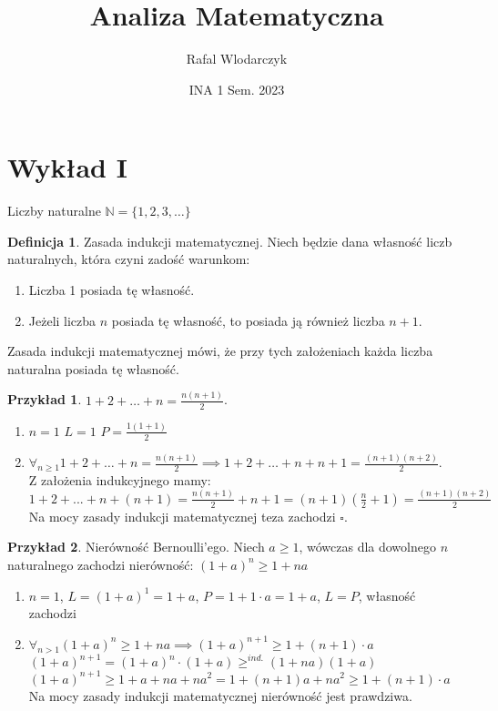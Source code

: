 \documentclass{article}
\author{Rafal Wlodarczyk}
\title{Analiza Matematyczna}
\date{INA 1 Sem. 2023}
\theoremstyle{definition}
\newtheorem{de}{Definicja}[subsection]
\theoremstyle{definition}
\theoremstyle{definition}
\newtheorem{pk}{Przykład}[subsection]
\theoremstyle{definition}
\begin{document}
\maketitle

\tableofcontents

\section{Wykład I}

Liczby naturalne $\mathbb{N}=\{1,2,3,\dots\}$

\begin{de}
    Zasada indukcji matematycznej. Niech będzie dana własność liczb naturalnych, która czyni zadość warunkom:
    \begin{enumerate}
        \item Liczba 1 posiada tę własność.
        \item Jeżeli liczba $n$ posiada tę własność, to posiada ją również liczba $n+1$.
    \end{enumerate}
    Zasada indukcji matematycznej mówi, że przy tych założeniach każda liczba naturalna posiada tę własność.
\end{de}

\begin{pk}
    $1+2+\dots+n=\frac{n(n+1)}{2}$.
    \begin{enumerate}
        \item $n=1$ $L=1$ $P=\frac{1(1+1)}{2}$
        \item $\forall_{n\geq 1} 1+2+\dots+n=\frac{n(n+1)}{2} \implies 1+2+\dots+n+n+1=\frac{(n+1)(n+2)}{2}$.\\
        Z założenia indukcyjnego mamy:\\
        $1+2+...+n+(n+1)=\frac{n(n+1)}{2}+n+1=(n+1)(\frac{n}{2}+1)=\frac{(n+1)(n+2)}{2}$\\
        Na mocy zasady indukcji matematycznej teza zachodzi $\square$.
    \end{enumerate}
\end{pk}

\begin{pk}
    Nierówność Bernoulli'ego. Niech $a\geq 1$, wówczas dla dowolnego $n$ naturalnego zachodzi nierówność:
    $(1+a)^n \geq 1 + na$
    \begin{enumerate}
        \item $n=1$, $L=(1+a)^1 = 1+a$, $P=1+1\cdot a = 1+ a$, $L=P$, własność zachodzi
        \item $\forall_{n>1} (1+a)^n \geq 1 + na \implies (1+a)^{n+1} \geq 1 + (n+1)\cdot a$\\
        $(1+a)^{n+1}=(1+a)^n\cdot(1+a)\geq^{ind.} (1+na)(1+a)$\\
        $(1+a)^{n+1} \geq 1 + a + na + na^2 = 1 + (n+1)a + na^2 \geq 1 + (n+1)\cdot a$\\
        Na mocy zasady indukcji matematycznej nierówność jest prawdziwa.
    \end{enumerate}
\end{pk}
\end{document}
